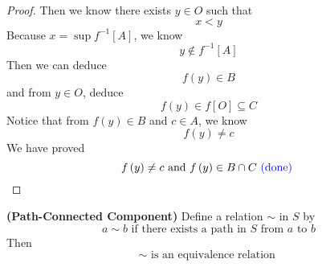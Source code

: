 \documentclass{report}
\begin{document}
\begin{proof}
Then we know there exists $y\in O$ such that 
\begin{equation*}
x<y
\end{equation*}
Because $x=\sup f^{-1}\left[A \right]$, we know 
\begin{equation*}
y \not\in f^{-1}\left[A \right]
\end{equation*}
Then we can deduce 
\begin{equation*}
f\left(y \right)\in B
\end{equation*}
and from $y\in O$, deduce
\begin{equation*}
f\left(y \right)\in f\left[O \right]\subseteq C
\end{equation*}
Notice that from $f\left(y \right)\in B$ and $c\in A$, we know 
\begin{equation*}
f\left(y \right)\neq c
\end{equation*}
We have proved
\begin{equation*}
f\left(y \right)\neq c\text{ and }f\left(y \right)\in B\cap C\textcolor{blue}{\text{ (done) }}
\end{equation*}
\end{proof}
\begin{theorem}
\label{2.3.8}
\textbf{(Path-Connected Component)} Define a relation $\sim$ in $S$ by 
\begin{equation*}
a\sim b\text{ if there exists a path in $S$ from $a$ to  $b$}
\end{equation*}
Then 
\begin{equation*}
\sim\text{ is an equivalence relation }
\end{equation*}
\end{theorem}
\end{document}
